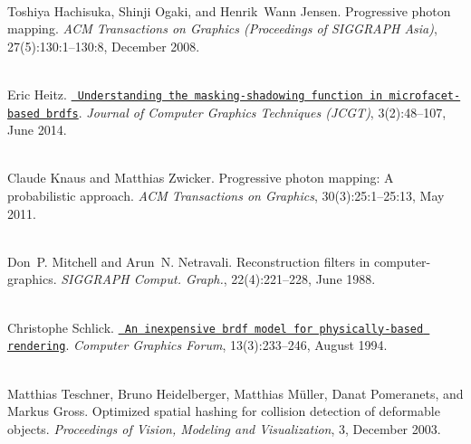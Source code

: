 \begin{DoxyDescription}
\item[\label{citelist_CITEREF_Hachisuka:2008:Progressive}%
\Hypertarget{citelist_CITEREF_Hachisuka:2008:Progressive}%
\mbox{[}7\mbox{]}]\hfill \\
Toshiya Hachisuka, Shinji Ogaki, and Henrik~Wann Jensen. Progressive photon mapping. {\itshape ACM Transactions on Graphics (Proceedings of SIGGRAPH Asia)}, 27(5)\+:130\+:1--130\+:8, December 2008. 


\item[\label{citelist_CITEREF_Heitz:2014:Microfacet}%
\Hypertarget{citelist_CITEREF_Heitz:2014:Microfacet}%
\mbox{[}8\mbox{]}]\hfill \\
Eric Heitz. \href{http://jcgt.org/published/0003/02/03/}{\texttt{ Understanding the masking-\/shadowing function in microfacet-\/based brdfs}}. {\itshape Journal of Computer Graphics Techniques (JCGT)}, 3(2)\+:48--107, June 2014.


\item[\label{citelist_CITEREF_Knaus:2011:Progressive}%
\Hypertarget{citelist_CITEREF_Knaus:2011:Progressive}%
\mbox{[}9\mbox{]}]\hfill \\
Claude Knaus and Matthias Zwicker. Progressive photon mapping\+: A probabilistic approach. {\itshape ACM Transactions on Graphics}, 30(3)\+:25\+:1--25\+:13, May 2011. 


\item[\label{citelist_CITEREF_Mitchell:1988:Reconstruction}%
\Hypertarget{citelist_CITEREF_Mitchell:1988:Reconstruction}%
\mbox{[}10\mbox{]}]\hfill \\
Don~P. Mitchell and Arun~N. Netravali. Reconstruction filters in computer-\/graphics. {\itshape SIGGRAPH Comput. Graph.}, 22(4)\+:221--228, June 1988. 


\item[\label{citelist_CITEREF_Schlick:1994:BRDF}%
\Hypertarget{citelist_CITEREF_Schlick:1994:BRDF}%
\mbox{[}11\mbox{]}]\hfill \\
Christophe Schlick. \href{https://onlinelibrary.wiley.com/doi/abs/10.1111/1467-8659.1330233}{\texttt{ An inexpensive brdf model for physically-\/based rendering}}. {\itshape Computer Graphics Forum}, 13(3)\+:233--246, August 1994. 


\item[\label{citelist_CITEREF_Teschner:2003:Optimized}%
\Hypertarget{citelist_CITEREF_Teschner:2003:Optimized}%
\mbox{[}12\mbox{]}]\hfill \\
Matthias Teschner, Bruno Heidelberger, Matthias Müller, Danat Pomeranets, and Markus Gross. Optimized spatial hashing for collision detection of deformable objects. {\itshape Proceedings of Vision, Modeling and Visualization}, 3, December 2003.



\end{DoxyDescription}
